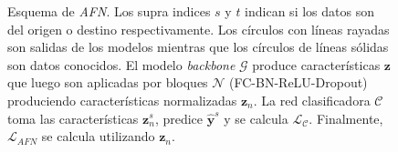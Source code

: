 \begin{figure}[H]
  \caption[Esquema de {\it AFN}]{Esquema de {\it AFN}. Los supra indices $s$ y $t$ indican si los datos son del origen o destino respectivamente.
  Los círculos con líneas rayadas son salidas de los modelos mientras que los círculos de líneas sólidas son datos conocidos. El modelo {\it backbone} $\mathcal{G}$ produce características $\mathbf{z}$ que luego son aplicadas por bloques $\mathcal{N}$ (FC-BN-ReLU-Dropout) produciendo características normalizadas $\mathbf{z}_n$. La red clasificadora $\mathcal{C}$ toma las características $\mathbf{z}_n^s$, predice $\hat{\mathbf{y}}^s$ y se calcula $\mathcal{L}_{\mathcal{C}}$. Finalmente, $\mathcal{L}_{AFN}$ se calcula utilizando $\mathbf{z}_n$.}
  \label{fig:afn-esquema}
\end{figure}


